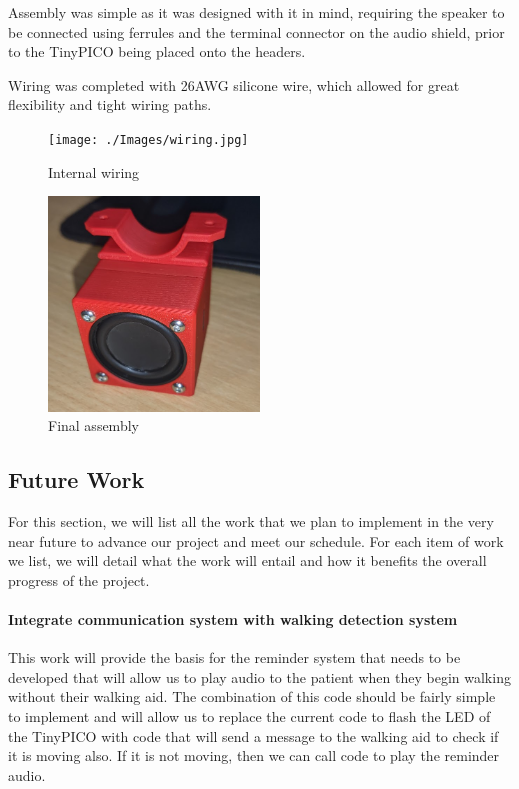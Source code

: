 {Assembly was simple as it was designed with it in mind, requiring the speaker to be connected using ferrules and the terminal connector on the audio shield, prior to the TinyPICO being placed onto the headers.

Wiring was completed with 26AWG silicone wire, which allowed for great flexibility and tight wiring paths.

    \begin{figure}[ht!]
        \centering %
            \texttt{[image: ./Images/wiring.jpg]}
            \caption{Internal wiring}
        \label{fig:gantt_chart}
    \end{figure}
    
        \begin{figure}[ht!]
        \centering %
            \includegraphics[width=0.5\textwidth,keepaspectratio, angle=0]{./Images/final-assembly.png}
            \caption{Final assembly}
        \label{fig:gantt_chart}
    \end{figure}

\subsection{Future Work}\label{sec:Future work}

For this section, we will list all the work that we plan to implement in the very near future to advance our project and meet our schedule. For each item of work we list, we will detail what the work will entail and how it benefits the overall progress of the project.

\paragraph{Integrate communication system with walking detection system}

This work will provide the basis for the reminder system that needs to be developed that will allow us to play audio to the patient when they begin walking without their walking aid. The combination of this code should be fairly simple to implement and will allow us to replace the current code to flash the LED of the TinyPICO with code that will send a message to the walking aid to check if it is moving also. If it is not moving, then we can call code to play the reminder audio.

}
